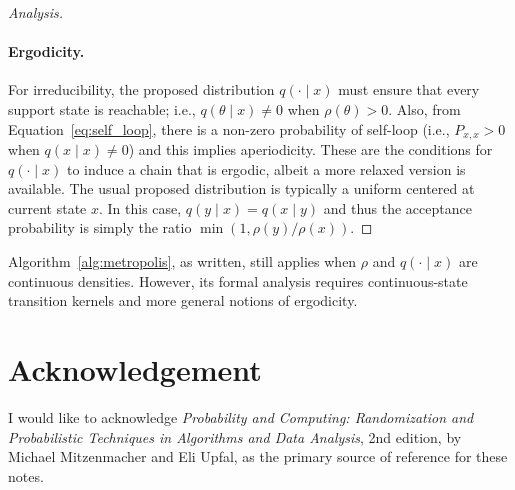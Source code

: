 \documentclass[12pt,a4paper]{article}
\newenvironment{analysis}[1][Analysis]%
{\begin{proof}[#1]}%
	{\end{proof}}
\begin{document}
\begin{analysis}
		\paragraph{Ergodicity.} For irreducibility, the proposed distribution \(q(\cdot\mid x)\) must ensure that every support state is reachable; i.e., \(q(\theta \mid x) \neq 0\) when \(\rho(\theta) > 0\). Also, from Equation~\ref{eq:self_loop}, there is a non-zero probability of self-loop (i.e., \(P_{x,x} > 0\) when \(q(x\mid x) \neq 0\)) and this implies aperiodicity. These are the conditions for \(q(\cdot\mid x)\) to induce a chain that is ergodic, albeit a more relaxed version is available. The usual proposed distribution is typically a uniform centered at current state \(x\). In this case, \(q(y\mid x) = q(x\mid y)\) and thus the acceptance probability is simply the ratio \(\min(1, \rho(y)/\rho(x))\).
	\end{analysis}
	
	Algorithm~\ref{alg:metropolis}, as written, still applies when \(\rho\) and \(q(\cdot\mid x)\) are continuous densities. However, its formal analysis requires continuous-state transition kernels and more general notions of ergodicity.
	
	\section*{Acknowledgement}
	I would like to acknowledge \emph{Probability and Computing: Randomization and Probabilistic Techniques in Algorithms and Data Analysis}, 2nd edition, by Michael Mitzenmacher and Eli Upfal, as the primary source of reference for these notes.
\end{document}
